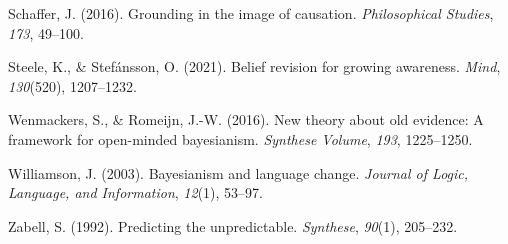 \documentclass[
  11pt,
  dvipsnames,enabledeprecatedfontcommands]{scrartcl}
\newlength{\cslhangindent}
\newlength{\cslentryspacingunit} %
\newenvironment{CSLReferences}[2] %
 {%
  \setlength{\parindent}{0pt}
  \ifodd #1
  \let\oldpar\par
  \def\par{\hangindent=\cslhangindent\oldpar}
  \fi
  \setlength{\parskip}{#2\cslentryspacingunit}
 }%
 {}
\begin{document}
\begin{CSLReferences}{1}{0}
\leavevmode{}%
Schaffer, J. (2016). Grounding in the image of causation.
\emph{Philosophical Studies}, \emph{173}, 49--100.

\leavevmode{}%
Steele, K., \& Stefánsson, O. (2021). Belief revision for growing
awareness. \emph{Mind}, \emph{130}(520), 1207--1232.

\leavevmode{}%
Wenmackers, S., \& Romeijn, J.-W. (2016). New theory about old evidence:
A framework for open-minded bayesianism. \emph{Synthese Volume},
\emph{193}, 1225--1250.

\leavevmode{}%
Williamson, J. (2003). Bayesianism and language change. \emph{Journal of
Logic, Language, and Information}, \emph{12}(1), 53--97.

\leavevmode{}%
Zabell, S. (1992). Predicting the unpredictable. \emph{Synthese},
\emph{90}(1), 205--232.

\end{CSLReferences}
\end{document}
